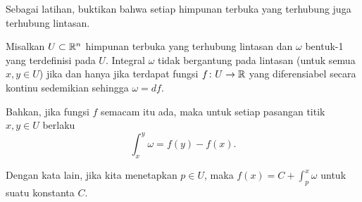 Sebagai latihan, buktikan bahwa setiap himpunan terbuka yang terhubung juga
terhubung lintasan.

\begin{prop} \label{mv:prop:pathinddf}
Misalkan $U \subset {\mathbb{R}}^n$ himpunan terbuka yang terhubung lintasan dan $\omega$
bentuk-1 yang terdefinisi pada $U$. Integral $\omega$ tidak bergantung pada
lintasan (untuk semua $x,y \in U$) jika dan hanya jika terdapat fungsi
$f \colon U \to {\mathbb{R}}$ yang diferensiabel secara kontinu sedemikian sehingga
$\omega = df$.

Bahkan, jika fungsi $f$ semacam itu ada, maka untuk setiap pasangan titik
$x,y \in U$ berlaku
\begin{equation*}
\int_{x}^y \omega = f(y)-f(x) .
\end{equation*}
\end{prop}

Dengan kata lain, jika kita menetapkan $p \in U$, maka
$f(x) = C + \int_{p}^x \omega$ untuk suatu konstanta $C$.

